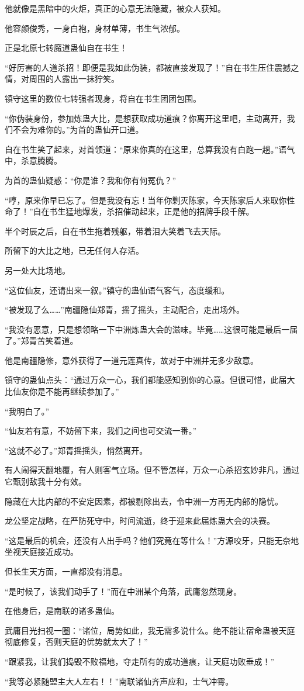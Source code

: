 \begin{this_body}
他就像是黑暗中的火炬，真正的心意无法隐藏，被众人获知。

他容颜俊秀，一身白袍，身材单薄，书生气浓郁。

正是北原七转魔道蛊仙自在书生！

“好厉害的人道杀招！即便是我如此伪装，都被直接发现了！”自在书生压住震撼之情，对周围的人露出一抹狞笑。

镇守这里的数位七转强者现身，将自在书生团团包围。

“你伪装身份，参加炼蛊大比，是想获取成功道痕？你离开这里吧，主动离开，我们不会为难你的。”为首的蛊仙开口道。

自在书生笑了起来，对首领道：“原来你真的在这里，总算我没有白跑一趟。”语气中，杀意腾腾。

为首的蛊仙疑惑：“你是谁？我和你有何冤仇？”

“哼，原来你早已忘了。但是我没有忘！当年你剿灭陈家，今天陈家后人来取你性命了！”自在书生猛地爆发，杀招催动起来，正是他的招牌手段千解。

半个时辰之后，自在书生拖着残躯，带着泪大笑着飞去天际。

所留下的大比之地，已无任何人存活。

另一处大比场地。

“这位仙友，还请出来一叙。”镇守的蛊仙语气客气，态度缓和。

“被发现了么……”南疆隐仙郑青，摇了摇头，主动配合，走出场外。

“我没有恶意，只是想领略一下中洲炼蛊大会的滋味。毕竟……这很可能是最后一届了。”郑青苦笑着道。

他是南疆隐修，意外获得了一道元莲真传，故对于中洲并无多少敌意。

镇守的蛊仙点头：“通过万众一心，我们都能感知到你的心意。但很可惜，此届大比仙友你是不能再继续参加了。”

“我明白了。”

“仙友若有意，不妨留下来，我们之间也可交流一番。”

“这就不必了。”郑青摇摇头，悄然离开。

有人闹得天翻地覆，有人则客气立场。但不管怎样，万众一心杀招玄妙非凡，通过它甄别敌我十分有效。

隐藏在大比内部的不安定因素，都被剔除出去，令中洲一方再无内部的隐忧。

龙公坚定战略，在严防死守中，时间流逝，终于迎来此届炼蛊大会的决赛。

“这是最后的机会，还没有人出手吗？他们究竟在等什么！”方源咬牙，只能无奈地坐视天庭接近成功。

但长生天方面，一直都没有消息。

“是时候了，该我们动手了！”而在中洲某个角落，武庸忽然现身。

在他身后，是南联的诸多蛊仙。

武庸目光扫视一圈：“诸位，局势如此，我无需多说什么。绝不能让宿命蛊被天庭彻底修复，否则天庭的优势就太大了！”

“跟紧我，让我们捣毁不败福地，夺走所有的成功道痕，让天庭功败垂成！”

“我等必紧随盟主大人左右！！”南联诸仙齐声应和，士气冲霄。

\end{this_body}

